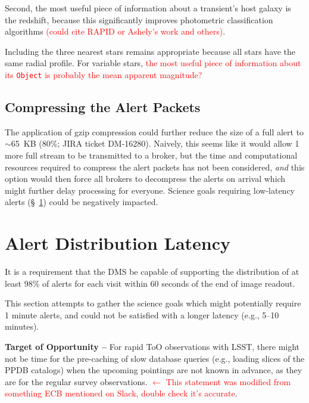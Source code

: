 \documentclass[DM,lsstdraft,authoryear,toc]{lsstdoc}
\begin{document}
Second, the most useful piece of information about a transient's host galaxy is the redshift, because this significantly improves photometric classification algorithms \textcolor{red}{(could cite RAPID or Ashely's work and others)}. 

Including the three nearest stars remains appropriate because all stars have the same radial profile. For variable stars, \textcolor{red}{the most useful piece of information about its {\tt Object} is probably the mean apparent magnitude?}


\subsection{Compressing the Alert Packets}\label{ssec:packets_compress}

The application of gzip compression could further reduce the size of a full alert to $\sim$65~KB (80\%; JIRA ticket DM-16280). Naively, this seems like it would allow 1 more full stream to be transmitted to a broker, but the time and computational resources required to compress the alert packets has not been considered, \emph{and} this option would then force all brokers to decompress the alerts on arrival which might further delay processing for everyone. Science goals requiring low-latency alerts (\S~\ref{sec:latency}) could be negatively impacted.


\clearpage
\section{Alert Distribution Latency} \label{sec:latency}

It is a requirement that the DMS be capable of supporting the distribution of at least 98\% of alerts for each visit within 60 seconds of the end of image readout.

This section attempts to gather the science goals which might potentially require 1 minute alerts, and could not be satisfied with a longer latency (e.g., 5--10 minutes).

{\bf Target of Opportunity --} For rapid ToO observations with LSST, there might not be time for the pre-caching of slow database queries (e.g., loading slices of the PPDB catalogs) when the upcoming pointings are not known in advance, as they are for the regular survey observations. \textcolor{red}{$\leftarrow$ This statement was modified from something ECB mentioned on Slack, double check it's accurate}.
\end{document}
